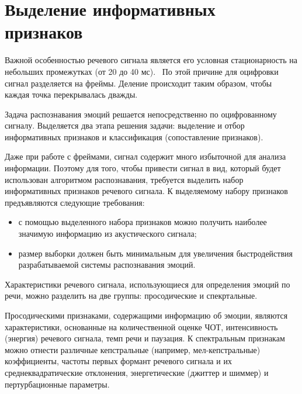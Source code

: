 

\section{Выделение информативных признаков}
Важной особенностью речевого сигнала является его условная стационарность на небольших промежутках (от 20 до 40 мс).~\cite{frames} По этой причине для оцифровки сигнал разделяется на фреймы. Деление происходит таким образом, чтобы каждая точка перекрывалась дважды.~\cite{mfcc-steps}

Задача распознавания эмоций решается непосредственно по оцифрованному сигналу. Выделяется два этапа решения задачи: выделение и отбор информативных признаков и классификация (сопоставление признаков).


Даже при работе с фреймами, сигнал содержит много избыточной для анализа информации. Поэтому для того, чтобы привести сигнал в вид, который будет использован алгоритмом распознавания, требуется выделить набор информативных признаков речевого сигнала. К выделяемому набору признаков предъявляются следующие требования: \cite{features-must}
\begin{itemize}
	\item с помощью выделенного набора признаков можно получить наиболее значимую информацию из акустического сигнала;
	\item размер выборки должен быть минимальным для увеличения быстродействия разрабатываемой системы распознавания эмоций.
\end{itemize}
Характеристики речевого сигнала, использующиеся для определения эмоций по речи, можно разделить на две группы: просодические и спекртальные. 

Просодическими признаками, содержащими информацию об эмоции, являются характеристики, основанные на количественной оценке ЧОТ, интенсивность (энергия) речевого сигнала, темп речи и паузация. К спектральным признакам можно отнести различные кепстральные (например, мел-кепстральные) коэффициенты, частоты первых формант речевого сигнала и их среднеквадратические отклонения, энергетические (джиттер и шиммер) и пертурбационные параметры.

